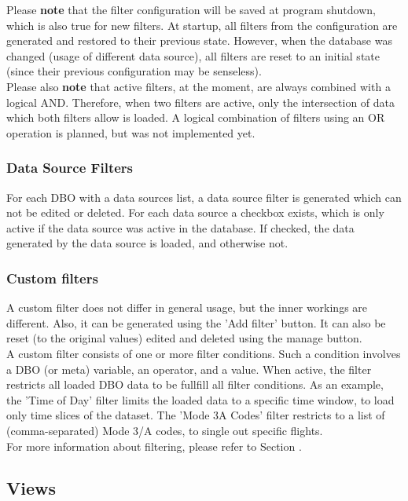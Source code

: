 Please \textbf{note} that the filter configuration will be saved at program shutdown, which is also true for new
filters.   At  startup,  all  filters  from  the  configuration  are  generated  and  restored  to  their  previous  state. However, when the database was changed (usage of different data source), all filters are reset to an initial
state (since their previous configuration may be senseless). \\

Please also \textbf{note} that active filters, at the moment, are always combined with a logical AND. Therefore,
when  two  filters  are  active,  only  the  intersection  of  data  which  both  filters  allow  is  loaded.   A  logical combination of filters using an OR operation is planned, but was not implemented yet.

\subsubsection{Data Source Filters}
For each DBO with a data sources list, a data source filter is generated which can not be edited or deleted.  For each
data source a checkbox exists, which is only active if the data source was active in the database. If checked, the
data generated by the data source is loaded, and otherwise not.

\subsubsection{Custom filters}
A  custom  filter  does  not  differ  in  general  usage,  but  the  inner  workings  are  different.   Also,  it  can  be generated using the 'Add filter' button. It can also be reset (to the original values) edited and deleted using
the manage button. \\
A custom filter consists of one or more filter conditions.  Such a condition involves a DBO (or meta) variable, an operator, and a value.  When active, the filter restricts all loaded DBO data to be fullfill all filter conditions.
As an example, the 'Time of Day' filter limits the loaded data to a specific time window, to load only time slices of the dataset.  The 'Mode 3A Codes' filter restricts to a list of (comma-separated) Mode 3/A codes, to single out specific flights. \\

For more information about filtering, please refer to Section .

\subsection{Views}

